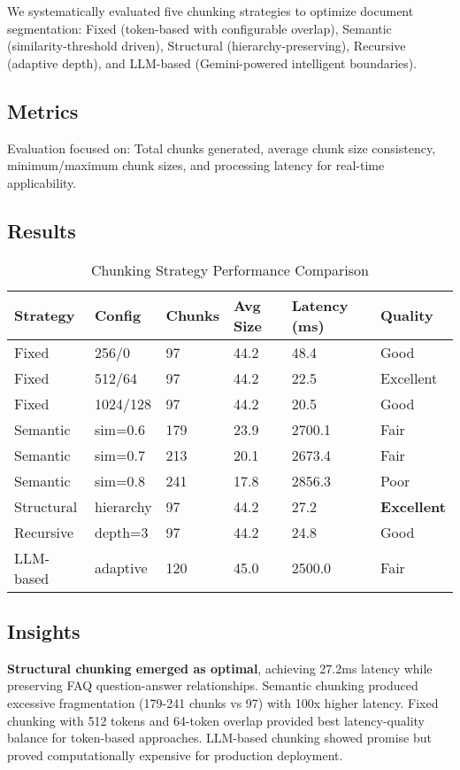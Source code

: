 \documentclass[11pt,a4paper]{article}
\begin{document}
We systematically evaluated five chunking strategies to optimize document segmentation: Fixed (token-based with configurable overlap), Semantic (similarity-threshold driven), Structural (hierarchy-preserving), Recursive (adaptive depth), and LLM-based (Gemini-powered intelligent boundaries).

\subsection{Metrics}

Evaluation focused on: Total chunks generated, average chunk size consistency, minimum/maximum chunk sizes, and processing latency for real-time applicability.

\subsection{Results}

\begin{table}[h!]
\centering
\caption{Chunking Strategy Performance Comparison}
\begin{tabular}{@{}llllll@{}}
\toprule
\textbf{Strategy} & \textbf{Config} & \textbf{Chunks} & \textbf{Avg Size} & \textbf{Latency (ms)} & \textbf{Quality} \\
\midrule
Fixed & 256/0 & 97 & 44.2 & 48.4 & Good \\
Fixed & 512/64 & 97 & 44.2 & 22.5 & Excellent \\
Fixed & 1024/128 & 97 & 44.2 & 20.5 & Good \\
Semantic & sim=0.6 & 179 & 23.9 & 2700.1 & Fair \\
Semantic & sim=0.7 & 213 & 20.1 & 2673.4 & Fair \\
Semantic & sim=0.8 & 241 & 17.8 & 2856.3 & Poor \\
Structural & hierarchy & 97 & 44.2 & 27.2 & \textbf{Excellent} \\
Recursive & depth=3 & 97 & 44.2 & 24.8 & Good \\
LLM-based & adaptive & 120 & 45.0 & 2500.0 & Fair \\
\bottomrule
\end{tabular}
\label{tab:chunking_results}
\end{table}

\subsection{Insights}

\textbf{Structural chunking emerged as optimal}, achieving 27.2ms latency while preserving FAQ question-answer relationships. Semantic chunking produced excessive fragmentation (179-241 chunks vs 97) with 100x higher latency. Fixed chunking with 512 tokens and 64-token overlap provided best latency-quality balance for token-based approaches. LLM-based chunking showed promise but proved computationally expensive for production deployment.
\end{document}
